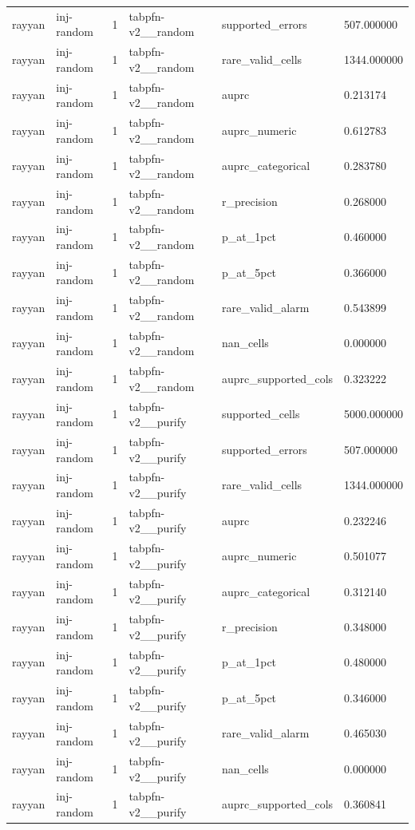 \begin{tabular}{llllll}
rayyan & inj-random & 1 & tabpfn-v2\_\_random & supported\_errors & 507.000000 \\
rayyan & inj-random & 1 & tabpfn-v2\_\_random & rare\_valid\_cells & 1344.000000 \\
rayyan & inj-random & 1 & tabpfn-v2\_\_random & auprc & 0.213174 \\
rayyan & inj-random & 1 & tabpfn-v2\_\_random & auprc\_numeric & 0.612783 \\
rayyan & inj-random & 1 & tabpfn-v2\_\_random & auprc\_categorical & 0.283780 \\
rayyan & inj-random & 1 & tabpfn-v2\_\_random & r\_precision & 0.268000 \\
rayyan & inj-random & 1 & tabpfn-v2\_\_random & p\_at\_1pct & 0.460000 \\
rayyan & inj-random & 1 & tabpfn-v2\_\_random & p\_at\_5pct & 0.366000 \\
rayyan & inj-random & 1 & tabpfn-v2\_\_random & rare\_valid\_alarm & 0.543899 \\
rayyan & inj-random & 1 & tabpfn-v2\_\_random & nan\_cells & 0.000000 \\
rayyan & inj-random & 1 & tabpfn-v2\_\_random & auprc\_supported\_cols & 0.323222 \\
rayyan & inj-random & 1 & tabpfn-v2\_\_purify & supported\_cells & 5000.000000 \\
rayyan & inj-random & 1 & tabpfn-v2\_\_purify & supported\_errors & 507.000000 \\
rayyan & inj-random & 1 & tabpfn-v2\_\_purify & rare\_valid\_cells & 1344.000000 \\
rayyan & inj-random & 1 & tabpfn-v2\_\_purify & auprc & 0.232246 \\
rayyan & inj-random & 1 & tabpfn-v2\_\_purify & auprc\_numeric & 0.501077 \\
rayyan & inj-random & 1 & tabpfn-v2\_\_purify & auprc\_categorical & 0.312140 \\
rayyan & inj-random & 1 & tabpfn-v2\_\_purify & r\_precision & 0.348000 \\
rayyan & inj-random & 1 & tabpfn-v2\_\_purify & p\_at\_1pct & 0.480000 \\
rayyan & inj-random & 1 & tabpfn-v2\_\_purify & p\_at\_5pct & 0.346000 \\
rayyan & inj-random & 1 & tabpfn-v2\_\_purify & rare\_valid\_alarm & 0.465030 \\
rayyan & inj-random & 1 & tabpfn-v2\_\_purify & nan\_cells & 0.000000 \\
rayyan & inj-random & 1 & tabpfn-v2\_\_purify & auprc\_supported\_cols & 0.360841 \\

\end{tabular}
